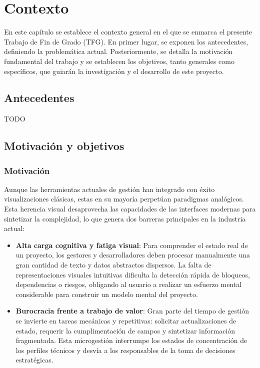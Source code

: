 \chapter{Contexto}
\label{chap:contexto}

En este capítulo se establece el contexto general en el que se enmarca el presente Trabajo de Fin de Grado (TFG). En primer lugar, se exponen los antecedentes, definiendo la problemática actual. Posteriormente, se detalla la motivación fundamental del trabajo y se establecen los objetivos, tanto generales como específicos, que guiarán la investigación y el desarrollo de este proyecto.

\section{Antecedentes}
\label{sec:antecedentes}

TODO

\section{Motivación y objetivos}
\label{sec:motivacion_objetivos}

\subsection{Motivación}
Aunque las herramientas actuales de gestión han integrado con éxito visualizaciones clásicas, estas en su mayoría perpetúan paradigmas analógicos. Esta herencia visual desaprovecha las capacidades de las interfaces modernas para sintetizar la complejidad, lo que genera dos barreras principales en la industria actual:

\begin{itemize}
    \item \textbf{Alta carga cognitiva y fatiga visual}: Para comprender el estado real de un proyecto, los gestores y desarrolladores deben procesar manualmente una gran cantidad de texto y datos abstractos dispersos. La falta de representaciones visuales intuitivas dificulta la detección rápida de bloqueos, dependencias o riesgos, obligando al usuario a realizar un esfuerzo mental considerable para construir un modelo mental del proyecto.
    \item \textbf{Burocracia frente a trabajo de valor}: Gran parte del tiempo de gestión se invierte en tareas mecánicas y repetitivas: solicitar actualizaciones de estado, requerir la cumplimentación de campos y sintetizar información fragmentada. Esta microgestión interrumpe los estados de concentración de los perfiles técnicos y desvía a los responsables de la toma de decisiones estratégicas.
\end{itemize}

